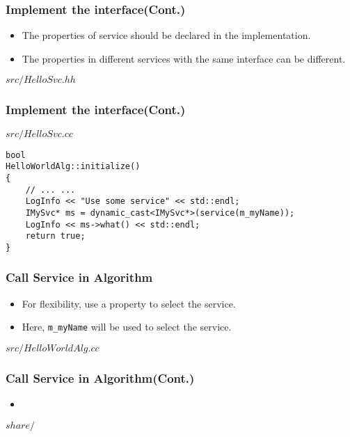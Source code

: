 \begin{frame}
    \frametitle{Implement the interface(Cont.)}
    \begin{itemize}
        \item The properties of service should be declared in the 
                implementation.
        \item The properties in different services with the same interface 
                can be different.
    \end{itemize}
    \begin{block}{\(src/HelloSvc.hh\)}
    \par\usebox{\implinterfaceheader}
    \end{block}
\end{frame}
\begin{frame}
    \frametitle{Implement the interface(Cont.)}
    \begin{block}{\(src/HelloSvc.cc\)}
    \par\usebox{\implinterfaceimpl}
    \end{block}
\end{frame}

\newsavebox{\callsvc}
\begin{lrbox}{\callsvc}
\begin{lstlisting}
bool
HelloWorldAlg::initialize()
{
    // ... ...
    LogInfo << "Use some service" << std::endl;
    IMySvc* ms = dynamic_cast<IMySvc*>(service(m_myName));
    LogInfo << ms->what() << std::endl;
    return true;
}
\end{lstlisting}
\end{lrbox}

\begin{frame}
    \frametitle{Call Service in Algorithm}
    \begin{itemize}
        \item For flexibility, use a property to select the service.
        \item Here, {\tt m\_myName} will be used to select the service.
    \end{itemize}
    \begin{block}{\(src/HelloWorldAlg.cc\)}
        \par\usebox{\callsvc}
    \end{block}
\end{frame}

\begin{frame}
    \frametitle{Call Service in Algorithm(Cont.)}
    \begin{itemize}
        \item 
    \end{itemize}
    \begin{block}{\(share/\)}
        \par\usebox{\callsvc}
    \end{block}
\end{frame}
